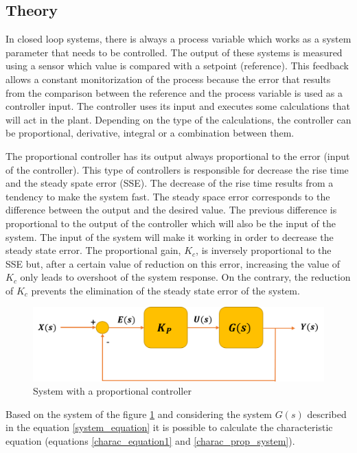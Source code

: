 \subsection{Theory}

In closed loop systems, there is always a process variable which works as a system parameter that needs to be controlled. The output of these systems is measured using a sensor which value is compared with a setpoint (reference). This feedback allows a constant monitorization of the process because the error that results from the comparison between the reference and the process variable is used as a controller input. The controller uses its input and executes some calculations that will act in the plant. Depending on the type of the calculations, the controller can be proportional, derivative, integral or a combination between them.

The proportional controller has its output always proportional to the error (input of the controller). This type of controllers is responsible for decrease the rise time and the steady spate error (SSE). The decrease of the rise time results from a tendency to make the system fast. The steady space error corresponds to the difference between the output and the desired value. The previous difference is proportional to the output of the controller which will also be the input of the system. The input of the system will make it working in order to decrease the steady state error. The proportional gain, $K_c$, is inversely proportional to the SSE but, after a certain value of reduction on this error, increasing the value of $K_c$ only leads to overshoot of the system response. On the contrary, the reduction of $K_c$ prevents the elimination of the steady state error of the system. 

\begin{figure}[H]
	\centering
	\includegraphics[scale=0.6]{figures/propor_controller.png}
	\caption{System with a proportional controller}
	\label{propor_controller}
\end{figure}

Based on the system of the figure \ref{propor_controller} and considering the system $G(s)$ described in the equation \ref{system_equation} it is possible to calculate the characteristic equation (equations \ref{charac_equation1} and \ref{charac_prop_system}).

